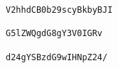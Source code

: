 \begin{tcolorbox}[colback=red!5!white,colframe=red!75!black, left=0pt, right=0pt]
\begin{lstlisting}
V2hhdCB0b29scyBkbyBJI

G5lZWQgdG8gY3V0IGRv

d24gYSBzdG9wIHNpZ24/
\end{lstlisting}
\end{tcolorbox}

